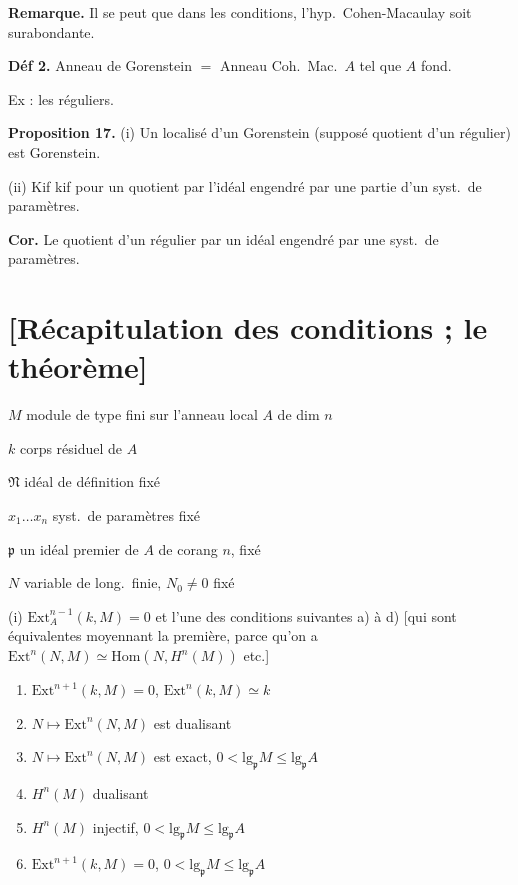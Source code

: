 \documentclass[11pt,a4paper]{article}
\begin{document}
\textbf{Remarque.} \struck{\ill{}} Il se peut que dans 
les conditions, l'hyp.\ Cohen-Macaulay soit surabondante.

\textbf{Déf 2.} Anneau de Gorenstein $=$ Anneau Coh.\ Mac.\ $A$ tel que
$A$ \struck{\ill{}} fond.

Ex : les réguliers.

\textbf{Proposition 17.} (i) Un localisé d'un Gorenstein
(supposé quotient d'un régulier) est Gorenstein.

(ii) Kif kif pour un quotient par l'idéal engendré par une partie d'un
syst.\ de paramètres.

\textbf{Cor.} Le quotient d'un régulier par un idéal engendré par une
 syst.\ de paramètres.

\section{[Récapitulation des conditions ; le théorème]}


$M$ module de type fini sur l'anneau local $A$ de dim $n$

$k$ corps résiduel de $A$

$\mathfrak{N}$ idéal de définition fixé

$x_1 \ldots x_n$ syst.\ de paramètres fixé

$\mathfrak{p}$ un idéal premier de $A$ de corang $n$, fixé

$N$ variable de long.\ finie, $N_0 \neq 0$ fixé

\struck{\ill{}} (i) $\mathrm{Ext}^{n-1}_A(k, M) = 0$ et l'une des
conditions suivantes a) à d) [qui sont équivalentes moyennant la
première, parce qu'on a $\mathrm{Ext}^n(N, M) \simeq
\mathrm{Hom}(N, H^n(M))$ etc.]
\begin{enumerate}
  \item[a)] $\mathrm{Ext}^{n+1}(k, M) = 0$, \quad
    $\mathrm{Ext}^n(k, M) \simeq k$
  \item[$*$b)] $N \mapsto \mathrm{Ext}^n(N, M)$ est dualisant
  \item[$*$c)] $N \mapsto \mathrm{Ext}^n(N, M)$ est exact,
    $0 < \mathrm{lg}_{\mathfrak{p}} M \leq \mathrm{lg}_{\mathfrak{p}} A$
  \item[b')] $H^n(M)$ dualisant
  \item[c')] $H^n(M)$ injectif,
    $0 < \mathrm{lg}_{\mathfrak{p}} M \leq \mathrm{lg}_{\mathfrak{p}} A$
  \item[d)] $\mathrm{Ext}^{n+1}(k, M) = 0$,
    $0 < \mathrm{lg}_{\mathfrak{p}} M \leq \mathrm{lg}_{\mathfrak{p}} A$
\end{enumerate}
\end{document}
